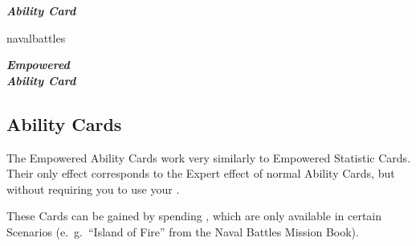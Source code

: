 \begin{paracol}{2}
  \begin{expansion}[title=\phantom{\textbf{\tiny{foo}}}, overlay={}]{}
    \footnotesize
    \begin{center}
      \begin{scriptsize}
      \end{scriptsize}
      \textbf{\textit{\textcolor{darkcandyapplered}{Ability Card\\\phantom{Blah}}}}
    \end{center}
  \end{expansion}
  \switchcolumn
  \begin{expansion}{navalbattles}
    \begin{minipage}[t]{0.3\linewidth}
      \footnotesize
      \vspace*{0mm}
      \begin{center}
        \begin{scriptsize}
        \end{scriptsize}
        \textbf{\textit{\textcolor{darkcandyapplered}{Empowered\\Ability Card}}}
      \end{center}
    \end{minipage}
    \hfill
    \begin{minipage}[t]{0.65\linewidth}
      \subsection*{ Ability Cards}
      The Empowered Ability Cards work very similarly to Empowered Statistic Cards.
      Their only effect corresponds to the Expert effect of normal Ability Cards, but without requiring you to use your .

      \medskip
      These Cards can be gained by spending , which are only available in certain Scenarios (e.~g.~``Island of Fire'' from the Naval Battles Mission Book).
    \end{minipage}
  \end{expansion}
\end{paracol}

